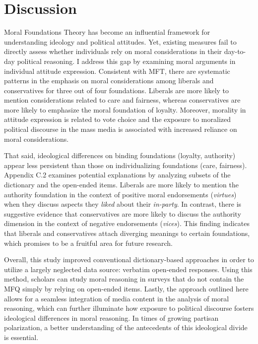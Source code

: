 \documentclass[12pt]{article}
\begin{document}
\section*{Discussion}

Moral Foundations Theory has become an influential framework for understanding ideology and political attitudes. Yet, existing measures fail to directly assess whether individuals rely on moral considerations in their day-to-day political reasoning. I address this gap by examining moral arguments in individual attitude expression. Consistent with MFT, there are systematic patterns in the emphasis on moral considerations among liberals and conservatives for three out of four foundations. Liberals are more likely to mention considerations related to care and fairness, whereas conservatives are more likely to emphasize the moral foundation of loyalty. Moreover, morality in attitude expression is related to vote choice and the exposure to moralized political discourse in the mass media is associated with increased reliance on moral considerations.

That said, ideological differences on binding foundations (loyalty, authority) appear less persistent than those on individualizing foundations (care, fairness). Appendix C.2 examines potential explanations by analyzing subsets of the dictionary and the open-ended items. Liberals are more likely to mention the authority foundation in the context of positive moral endorsements (\textit{virtues}) when they discuss aspects they \textit{liked} about their \textit{in-party}. In contrast, there is suggestive evidence that conservatives are more likely to discuss the authority dimension in the context of negative endorsements (\textit{vices}). This finding indicates that liberals and conservatives attach diverging meanings to certain foundations, which promises to be a fruitful area for future research.

Overall, this study improved conventional dictionary-based approaches in order to utilize a largely neglected data source: verbatim open-ended responses. Using this method, scholars can study moral reasoning in surveys that do not contain the MFQ simply by relying on open-ended items. Lastly, the approach outlined here allows for a seamless integration of media content in the analysis of moral reasoning, which can further illuminate how exposure to political discourse fosters ideological differences in moral reasoning. In times of growing partisan polarization, a better understanding of the antecedents of this ideological divide is essential.
\end{document}
